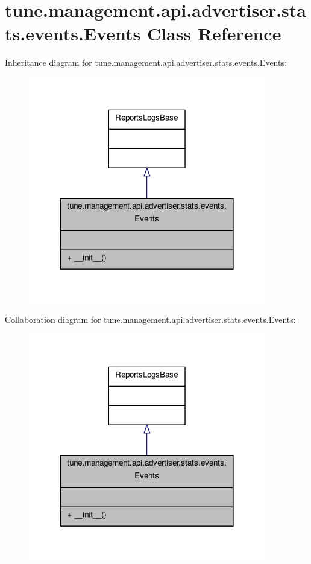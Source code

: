 \hypertarget{classtune_1_1management_1_1api_1_1advertiser_1_1stats_1_1events_1_1Events}{\section{tune.\-management.\-api.\-advertiser.\-stats.\-events.\-Events Class Reference}
\label{classtune_1_1management_1_1api_1_1advertiser_1_1stats_1_1events_1_1Events}
}


Inheritance diagram for tune.\-management.\-api.\-advertiser.\-stats.\-events.\-Events\-:
\nopagebreak
\begin{figure}[H]
\begin{center}
\leavevmode
\includegraphics[width=294pt]{classtune_1_1management_1_1api_1_1advertiser_1_1stats_1_1events_1_1Events__inherit__graph}
\end{center}
\end{figure}


Collaboration diagram for tune.\-management.\-api.\-advertiser.\-stats.\-events.\-Events\-:
\nopagebreak
\begin{figure}[H]
\begin{center}
\leavevmode
\includegraphics[width=294pt]{classtune_1_1management_1_1api_1_1advertiser_1_1stats_1_1events_1_1Events__coll__graph}
\end{center}
\end{figure}
